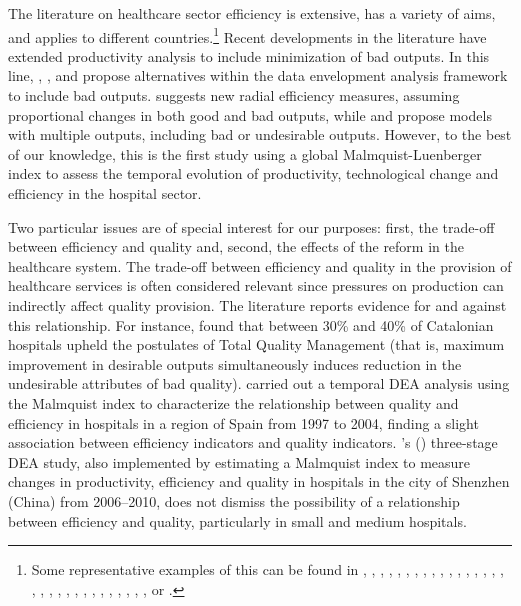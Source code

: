 \documentclass[11pt,a4paper,oneside]{article}
\begin{document}
The literature on healthcare sector efficiency is extensive, has a variety of aims, and applies to different countries.\footnote{Some representative examples of this can be 
found in \cite{Nunamaker:1983wi}, \cite{Lewin:1983tx}, \cite{Harris:2000dk}, 
\cite{Valdmanis:2008eo}, \cite{Weng:2009dr}, \cite{Harrison:2004kz}, 
\cite{Dexter:2004jx}, \cite{Hollingsworth:2003ht, Hollingsworth:2008hx}, 
\cite{Pina:1996hg}, \cite{Prior2001}, \cite{DalmauAtarrodona:1998jm}, 
\cite{Helmig:2001ik}, \cite{Field:2003bv}, \cite{Ersoy:1997dq}, 
\cite{Sahin:2000hj}, \cite{Giokas:2001hd}, \cite{Ouellette:2004ku}, 
\cite{Athanassopoulos:2001et}, \cite{Gerdtham:1999fy}, \cite{Biorn:2003dz}, 
\cite{Kirigia:2004ks}, \cite{Ferrier:2004wa}, \cite{Prior2006}, 
\cite{Grosskopf:2001dt, Grosskopf:2004ha}, \cite{Harrison:2004kz}, 
\cite{Wang:1999gm}, \cite{Cordero:2015el}, \cite{Martini:2014kg}, 
\cite{ONeill:1998ge}, \cite{Kalhor:2016cv}, \cite{Ozcan:1995kg} 
\cite{Chen:2016jv}, \cite{Buchner:2016ck} or \cite{JolaSanchez:2016jq}.} 
Recent developments in the literature have extended productivity analysis to include minimization of bad outputs. In this line, \cite{Scheel:2001dt}, 
\cite{Jahanshahloo:2004dg}, \cite{Ozcan:2005ko} and \cite{HadiVencheh:2005cf} 
propose alternatives within the data envelopment analysis framework 
\citep{Charnes:1978bf} to include bad outputs. \cite{Scheel:2001dt} suggests new radial efficiency measures, assuming 
proportional changes in both good and bad outputs, while 
\cite{Jahanshahloo:2004dg} and \cite{HadiVencheh:2005cf} propose models with 
multiple outputs, including bad or undesirable outputs. However, to the best 
of our knowledge, this is the first study using a global Malmquist-Luenberger 
index to assess the temporal evolution of productivity, technological 
change and efficiency in the hospital sector. 


Two particular issues are of special interest for our purposes: first, the 
trade-off between efficiency and quality and, second, the effects of the reform 
in the healthcare system. The trade-off between efficiency and quality in the 
provision of healthcare services is often considered relevant since pressures on production can indirectly affect quality provision. The literature reports evidence for and against this relationship. For instance,  \color{blue} \color{black} \cite{Prior2006} found that between 30\% and 40\% 
of Catalonian hospitals upheld the postulates of Total Quality Management 
(that is, maximum improvement in desirable outputs simultaneously induces reduction in the undesirable attributes of bad quality). \cite{NavarroEspigares:2010ko} carried out a temporal DEA analysis using the Malmquist index to characterize the relationship between 
quality and efficiency in hospitals in a region of Spain from 1997 to 2004, 
finding a slight association between efficiency indicators and quality 
indicators. \citeauthor{Yang:2014dy}'s (\citeyear{Yang:2014dy}) three-stage DEA study, also implemented by estimating a Malmquist index to measure changes in productivity, efficiency and quality in hospitals in the city of Shenzhen (China) from 
2006--2010, does not dismiss the possibility of a relationship between efficiency 
and quality, particularly in small and medium hospitals. 
\end{document}
